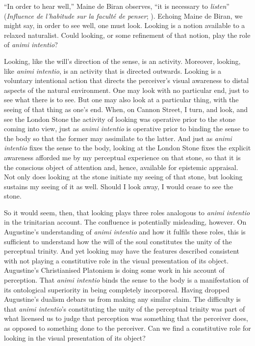 \documentclass[12pt]{article}
\begin{document}
``In order to hear well,'' Maine de Biran observes, ``it is necessary to \emph{listen}'' (\emph{Influence de l'habitude sur la faculté de penser}; \citealt[63--4]{Boehm:1929aa}). Echoing Maine de Biran, we might say, in order to see well, one must look. Looking is a notion available to a relaxed naturalist. Could looking, or some refinement of that notion, play the role of \emph{animi intentio}?

Looking, like the will's direction of the sense, is an activity. Moreover, looking, like \emph{animi intentio}, is an activity that is directed outwards. Looking is a voluntary intentional action that directs the perceiver's visual awareness to distal aspects of the natural environment. One may look with no particular end, just to see what there is to see. But one may also look at a particular thing, with the seeing of that thing as one's end. When, on Cannon Street, I turn, and look, and see the London Stone the activity of looking was operative prior to the stone coming into view, just as \emph{animi intentio} is operative prior to binding the sense to the body so that the former may assimilate to the latter. And just as \emph{animi intentio} fixes the sense to the body, looking at the London Stone fixes the explicit awareness afforded me by my perceptual experience on that stone, so that it is the conscious object of attention and, hence, available for epistemic appraisal. Not only does looking at the stone initiate my seeing of that stone, but looking sustains my seeing of it as well. Should I look away, I would cease to see the stone.

So it would seem, then, that looking plays three roles analogous to \emph{animi intentio} in the trinitarian account. The confluence is potentially misleading, however. On Augustine's understanding of \emph{animi intentio} and how it fulfils these roles, this is sufficient to understand how the will of the soul constitutes the unity of the perceptual trinity. And yet looking may have the features described consistent with not playing a constitutive role in the visual presentation of its object. Augustine's Christianised Platonism is doing some work in his account of perception. That \emph{animi intentio} binds the sense to the body is a manifestation of its ontological superiority in being completely incorporeal. Having dropped Augustine's dualism debars us from making any similar claim. The difficulty is that \emph{animi intentio}'s constituting the unity of the perceptual trinity was part of what licensed us to judge that perception was something that the perceiver does, as opposed to something done to the perceiver. Can we find a constitutive role for looking in the visual presentation of its object?
\end{document}
